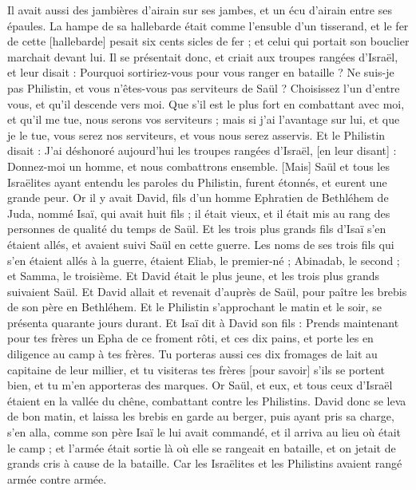\begin{multicols}{2}
Il avait aussi des jambières d'airain sur ses jambes, et un écu d'airain entre ses épaules.
La hampe de sa hallebarde était comme l'ensuble d'un tisserand, et le fer de cette [hallebarde] pesait six cents sicles de fer ; et celui qui portait son bouclier marchait devant lui.
Il se présentait donc, et criait aux troupes rangées d'Israël, et leur disait : Pourquoi sortiriez-vous pour vous ranger en bataille ? Ne suis-je pas Philistin, et vous n'êtes-vous pas serviteurs de Saül ? Choisissez l'un d'entre vous, et qu'il descende vers moi.
Que s'il est le plus fort en combattant avec moi, et qu'il me tue, nous serons vos serviteurs ; mais si j'ai l'avantage sur lui, et que je le tue, vous serez nos serviteurs, et vous nous serez asservis.
Et le Philistin disait : J'ai déshonoré aujourd'hui les troupes rangées d'Israël, [en leur disant] : Donnez-moi un homme, et nous combattrons ensemble.
[Mais] Saül et tous les Israëlites ayant entendu les paroles du Philistin, furent étonnés, et eurent une grande peur.
Or il y avait David, fils d'un homme Ephratien de Bethléhem de Juda, nommé Isaï, qui avait huit fils ; il était vieux, et il était mis au rang des personnes de qualité du temps de Saül.
Et les trois plus grands fils d'Isaï s'en étaient allés, et avaient suivi Saül en cette guerre. Les noms de ses trois fils qui s'en étaient allés à la guerre, étaient Eliab, le premier-né ; Abinadab, le second ; et Samma, le troisième.
Et David était le plus jeune, et les trois plus grands suivaient Saül.
Et David allait et revenait d'auprès de Saül, pour paître les brebis de son père en Bethléhem.
Et le Philistin s'approchant le matin et le soir, se présenta quarante jours durant.
Et Isaï dit à David son fils : Prends maintenant pour tes frères un Epha de ce froment rôti, et ces dix pains, et porte les en diligence au camp à tes frères.
Tu porteras aussi ces dix fromages de lait au capitaine de leur millier, et tu visiteras tes frères [pour savoir] s'ils se portent bien, et tu m'en apporteras des marques.
Or Saül, et eux, et tous ceux d'Israël étaient en la vallée du chêne, combattant contre les Philistins.
David donc se leva de bon matin, et laissa les brebis en garde au berger, puis ayant pris sa charge, s'en alla, comme son père Isaï le lui avait commandé, et il arriva au lieu où était le camp ; et l'armée était sortie là où elle se rangeait en bataille, et on jetait de grands cris à cause de la bataille.
Car les Israëlites et les Philistins avaient rangé armée contre armée.

\end{multicols}
